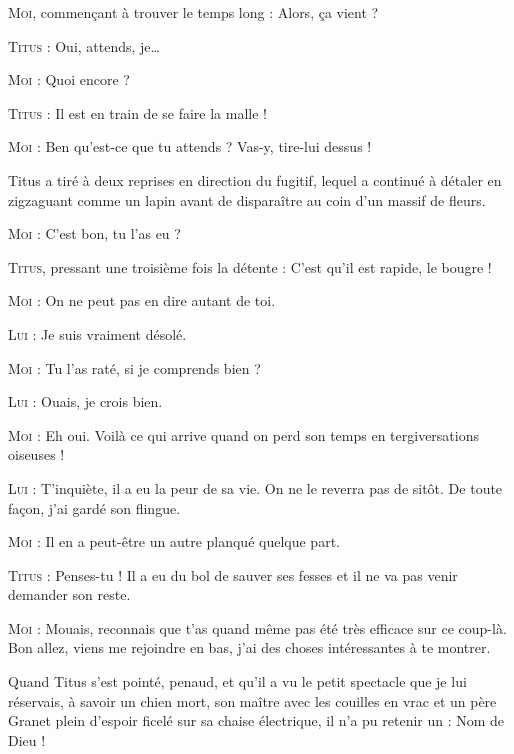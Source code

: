 \begin{dialogue}

\textsc{Moi}, commençant à trouver le temps long : Alors, ça vient ?

\textsc{Titus} : Oui, attends, je…

\textsc{Moi} : Quoi encore ?

\textsc{Titus} : Il est en train de se faire la malle !

\textsc{Moi} : Ben qu’est-ce que tu attends ? Vas-y, tire-lui dessus !

Titus a tiré à deux reprises en direction du fugitif, lequel a continué à détaler en zigzaguant comme un lapin avant de disparaître au coin d’un massif de fleurs.

\textsc{Moi} : C’est bon, tu l’as eu ?

\textsc{Titus}, pressant une troisième fois la détente : C’est qu’il est rapide, le bougre !

\textsc{Moi} : On ne peut pas en dire autant de toi.

\textsc{Lui} : Je suis vraiment désolé.

\textsc{Moi} : Tu l’as raté, si je comprends bien ?

\textsc{Lui} : Ouais, je crois bien.

\textsc{Moi} : Eh oui. Voilà ce qui arrive quand on perd son temps en tergiversations oiseuses !

\textsc{Lui} : T’inquiète, il a eu la peur de sa vie. On ne le reverra pas de sitôt. De toute façon, j’ai gardé son flingue.

\textsc{Moi} : Il en a peut-être un autre planqué quelque part.

\textsc{Titus} : Penses-tu ! Il a eu du bol de sauver ses fesses et il ne va pas venir demander son reste.

\textsc{Moi} : Mouais, reconnais que t’as quand même pas été très efficace sur ce coup-là. Bon allez, viens me rejoindre en bas, j’ai des choses intéressantes à te montrer.

\end{dialogue}

Quand Titus s’est pointé, penaud, et qu’il a vu le petit spectacle que je lui réservais, à savoir un chien mort, son maître avec les couilles en vrac et un père Granet plein d’espoir ficelé sur sa chaise électrique, il n’a pu retenir un : Nom de Dieu !

